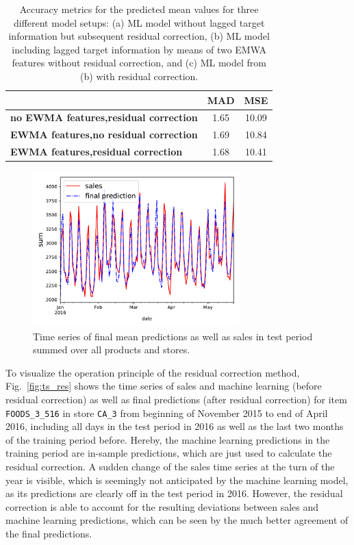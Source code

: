 \documentclass[BCOR=1mm, DIV=calc,10pt,
twoside=true,
twocolumn,
headings=normal]{scrartcl}
\newcommand{\fig}{Fig.~}
\begin{document}
\begin{table}[h!]
\begin{center}
\caption{Accuracy metrics for the predicted mean values for three different model setups: (a) ML model without lagged target information but subsequent residual correction, (b) ML model including lagged target information by means of two EMWA features without residual correction, and (c) ML model from (b) with residual correction.}
\label{tab:mad_mse}
\begin{tabular}{p{4cm}|c|c}
 & \textbf{MAD} & \textbf{MSE} \\
\hline
\textbf{no EWMA features,\newline residual correction} & 1.65 & 10.09 \\
\hline
\textbf{EWMA features,\newline no residual correction} & 1.69 & 10.84 \\
\hline
\textbf{EWMA features,\newline residual correction} & 1.68 & 10.41
\end{tabular}
\end{center}
\end{table}

\begin{figure}
\begin{center}
\includegraphics[width=8cm]{figs/ts_full}
\caption{\label{fig:mean_prediction} Time series of final mean predictions as well as sales in test period summed over all products and stores.}
\end{center}
\end{figure}

\noindent
To visualize the operation principle of the residual correction method, \fig \ref{fig:ts_res} shows the time series of sales and machine learning (before residual correction) as well as final predictions (after residual correction) for item \texttt{FOODS\_3\_516} in store \texttt{CA\_3} from beginning of November 2015 to end of April 2016, including all days in the test period in 2016 as well as the last two months of the training period before. Hereby, the machine learning predictions in the training period are in-sample predictions, which are just used to calculate the residual correction. A sudden change of the sales time series at the turn of the year is visible, which is seemingly not anticipated by the machine learning model, as its predictions are clearly off in the test period in 2016. However, the residual correction is able to account for the resulting deviations between sales and machine learning predictions, which can be seen by the much better agreement of the final predictions.
\end{document}
